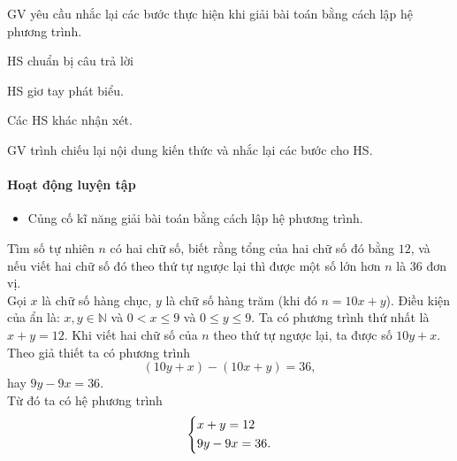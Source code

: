 \tochucthuchien

\begin{tcth}
	\buocmot
	\item GV yêu cầu nhắc lại các bước thực	hiện khi giải bài toán bằng cách lập hệ	phương trình.
	\buochai
	\item HS chuẩn bị câu trả lời
	\buocba
	\item HS giơ tay phát biểu.
	\item Các HS khác nhận xét.
	\buocbon
	\item GV trình chiếu lại nội dung kiến thức và nhắc lại các bước cho HS.
\end{tcth}

\paragraph{Hoạt động luyện tập}

\muctieu

\begin{itemize}
	\item Củng cố kĩ năng giải bài toán bằng cách lập hệ phương trình.
\end{itemize}

\noidungsanpham

\begin{baitap}[1.15]
	Tìm số tự nhiên $n$ có hai chữ số, biết rằng tổng của hai chữ số đó bằng $12$, và nếu viết hai chữ số đó theo thứ tự ngược lại thì được một số lớn hơn $n$ là $36$ đơn vị.
	\doicot
	\huongdan\\
	Gọi $x$ là chữ số hàng chục, $y$ là chữ số hàng trăm (khi đó $n = 10x + y$). Điều kiện của ẩn là: $x, y \in \mathbb{N}$ và $0 < x \le 9$ và $0 \le y \le 9$. Ta có phương trình thứ nhất là $x + y = 12$. Khi viết hai chữ số của $n$ theo thứ tự ngược lại, ta được số $10y + x$.\\	
	Theo giả thiết ta có phương trình 
	$$(10y + x) - (10x + y) = 36,$$ 
	hay $9y - 9x = 36$.\\
	Từ đó ta có hệ phương trình
	$$\left\{\begin{aligned}&x+y=12\\&9y-9x=36.\end{aligned}\right.$$
\end{baitap}

